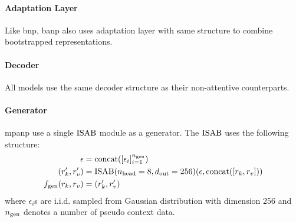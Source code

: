 \paragraph{Adaptation Layer}
Like \gls{bnp}, \gls{banp} also uses adaptation layer with same structure to combine bootstrapped representations.

\paragraph{Decoder}
All models use the same decoder structure as their non-attentive counterparts.

\paragraph{Generator}
\gls{mpanp} use a single $\text{ISAB}$ module as a generator. The $\text{ISAB}$ uses the following structure: 
\begin{align*}
    \epsilon &= \text{concat}([\epsilon_i]_{i=1}^{n_{\text{gen}}})\\
    (r_k',r_v') &= \text{ISAB}(n_{\text{head}}=8, d_{\text{out}}=256)(\epsilon,\text{concat}([r_k,r_v]))\\
    f_{\text{gen}}(r_k,r_v) &= (r_k',r_v')
\end{align*}
where $\epsilon_i$s are i.i.d. sampled from Gaussian distribution with dimension 256 and $n_{\text{gen}}$ denotes a number of pseudo context data.
